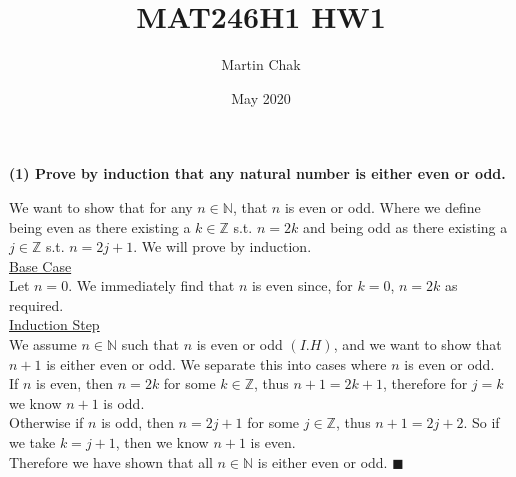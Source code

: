 \documentclass[20pt]{article}
\title{MAT246H1 HW1}
\author{Martin Chak}
\date{May 2020}
\begin{document}
\noindent
\begin{text}
    {\bf (1) Prove by induction that any natural number is either even or odd.}
    
    \noindent
    We want to show that for any $n \in \mathbb{N}$, that $n$ is even or odd. Where we define being even as there existing a $k \in \mathbb{Z}$ s.t. $n = 2k$ and being odd as there existing a $j \in \mathbb{Z}$ s.t. $n = 2j + 1$. We will prove by induction.\\
    
    \noindent
    \underline{Base Case}\\
    Let $n = 0$. We immediately find that $n$ is even since, for $k = 0$, $n = 2k$ as required.\\
    
    \noindent
    \underline{Induction Step}\\
    We assume $n \in \mathbb{N}$ such that $n$ is even or odd $(I.H)$, and we want to show that $n + 1$ is either even or odd. We separate this into cases where $n$ is even or odd.\\
    
    \noindent
    If $n$ is even, then $n = 2k$ for some $k \in \mathbb{Z}$, thus $n + 1 = 2k + 1$, therefore for $j = k$ we know $n + 1$ is odd.\\
    
    \noindent
    Otherwise if $n$ is odd, then $n = 2j + 1$ for some $j \in \mathbb{Z}$, thus $n + 1 = 2j + 2$. So if we take $k = j + 1$, then we know $n + 1$ is even.\\
    
    \noindent
    Therefore we have shown that all $n \in \mathbb{N}$ is either even or odd. \hfill $\blacksquare$
\end{text}\\
\end{document}
